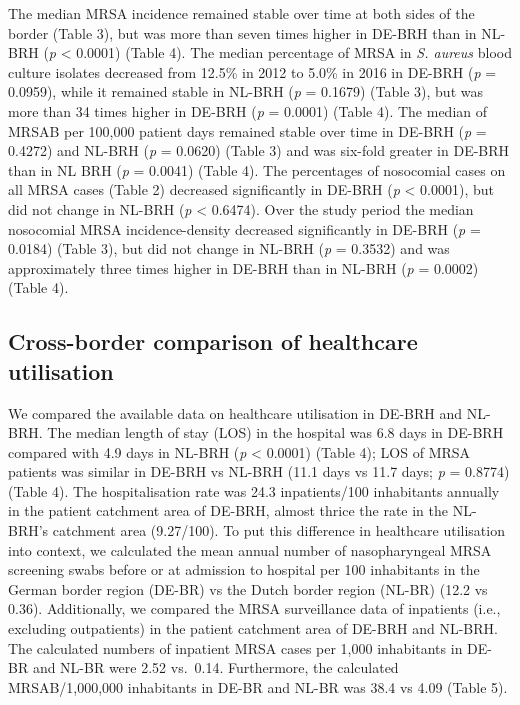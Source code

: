 \documentclass[
]{book}
\begin{document}
The median MRSA incidence remained stable over time at both sides of the border (Table 3), but was more than seven times higher in DE-BRH than in NL-BRH (\emph{p} \textless{} 0.0001) (Table 4). The median percentage of MRSA in \emph{S. aureus} blood culture isolates decreased from 12.5\% in 2012 to 5.0\% in 2016 in DE-BRH (\emph{p} = 0.0959), while it remained stable in NL-BRH (\emph{p} = 0.1679) (Table 3), but was more than 34 times higher in DE-BRH (\emph{p} = 0.0001) (Table 4). The median of MRSAB per 100,000 patient days remained stable over time in DE-BRH (\emph{p} = 0.4272) and NL-BRH (\emph{p} = 0.0620) (Table 3) and was six-fold greater in DE-BRH than in NL BRH (\emph{p} = 0.0041) (Table 4). The percentages of nosocomial cases on all MRSA cases (Table 2) decreased significantly in DE-BRH (\emph{p} \textless{} 0.0001), but did not change in NL-BRH (\emph{p} \textless{} 0.6474). Over the study period the median nosocomial MRSA incidence-density decreased significantly in DE-BRH (\emph{p} = 0.0184) (Table 3), but did not change in NL-BRH (\emph{p} = 0.3532) and was approximately three times higher in DE-BRH than in NL-BRH (\emph{p} = 0.0002) (Table 4).

\hypertarget{cross-border-comparison-of-healthcare-utilisation}{%
\subsection{Cross-border comparison of healthcare utilisation}\label{cross-border-comparison-of-healthcare-utilisation}}

We compared the available data on healthcare utilisation in DE-BRH and NL-BRH. The median length of stay (LOS) in the hospital was 6.8 days in DE-BRH compared with 4.9 days in NL-BRH (\emph{p} \textless{} 0.0001) (Table 4); LOS of MRSA patients was similar in DE-BRH vs NL-BRH (11.1 days vs 11.7 days; \emph{p} = 0.8774) (Table 4). The hospitalisation rate was 24.3 inpatients/100 inhabitants annually in the patient catchment area of DE-BRH, almost thrice the rate in the NL-BRH's catchment area (9.27/100). To put this difference in healthcare utilisation into context, we calculated the mean annual number of nasopharyngeal MRSA screening swabs before or at admission to hospital per 100 inhabitants in the German border region (DE-BR) vs the Dutch border region (NL-BR) (12.2 vs 0.36). Additionally, we compared the MRSA surveillance data of inpatients (i.e., excluding outpatients) in the patient catchment area of DE-BRH and NL-BRH. The calculated numbers of inpatient MRSA cases per 1,000 inhabitants in DE-BR and NL-BR were 2.52 vs.~0.14. Furthermore, the calculated MRSAB/1,000,000 inhabitants in DE-BR and NL-BR was 38.4 vs 4.09 (Table 5).
\end{document}
